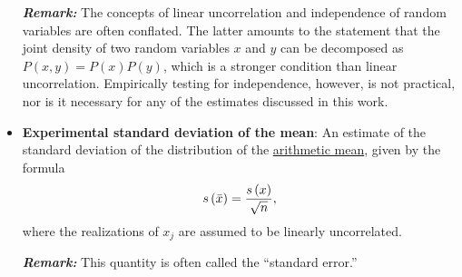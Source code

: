 \begin{itemize}

\textbf{\textit{Remark:}} The concepts of linear uncorrelation and independence of random variables are often conflated.  The latter amounts to the statement that the joint density of two random variables $x$ and $y$ can be decomposed as $P(x,y)=P(x)P(y)$, which is a stronger condition than linear uncorrelation.  Empirically testing for independence, however, is not practical, nor is it necessary for any of the estimates discussed in this work.
  
\item {\bf Experimental standard deviation of the mean}: An estimate of the standard deviation of the distribution of the \hyperref[def:arith_mean]{arithmetic mean}, given by the formula
  \begin{equation}
    s\left( \bar{x} \right) = \dfrac{s\left( x \right)}{\sqrt{n}}, \label{def:exp_st_dev_mean}
  \end{equation}
  where the realizations of $x_j$ are assumed to be linearly uncorrelated.

  
  

\smallskip
\textbf{\textit{Remark:}} This quantity is often called the ``standard error.''



\end{itemize}
